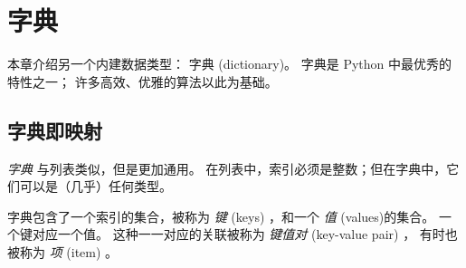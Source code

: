 

\chapter{字典}


本章介绍另一个内建数据类型： 字典 (dictionary)。
字典是 Python 中最优秀的特性之一； 许多高效、优雅的算法以此为基础。

\section{字典即映射}

  
  
  


{\em 字典} 与列表类似，但是更加通用。
在列表中，索引必须是整数；但在字典中，它们可以是（几乎）任何类型。


字典包含了一个索引的集合，被称为 {\em 键} (keys) ，和一个 {\em 值} (values)的集合。 一个键对应一个值。 这种一一对应的关联被称为 {\em 键值对} (key-value pair) ， 有时也被称为 {\em 项} (item) 。


